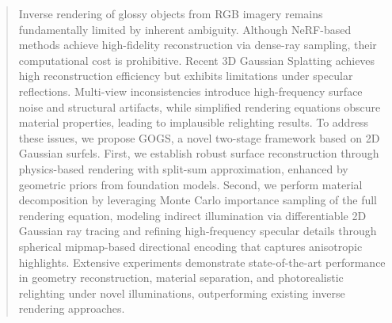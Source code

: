 \begin{abstract}
\vspace{-1em}
Inverse rendering of glossy objects from RGB imagery remains fundamentally limited by inherent ambiguity. Although NeRF-based methods achieve high-fidelity reconstruction via dense-ray sampling, their computational cost is prohibitive. Recent 3D Gaussian Splatting achieves high reconstruction efficiency but exhibits limitations under specular reflections. Multi-view inconsistencies introduce high-frequency surface noise and structural artifacts, while simplified rendering equations obscure material properties, leading to implausible relighting results. To address these issues, we propose GOGS, a novel two-stage framework based on 2D Gaussian surfels. First, we establish robust surface reconstruction through physics-based rendering with split-sum approximation, enhanced by geometric priors from foundation models. Second, we perform material decomposition by leveraging Monte Carlo importance sampling of the full rendering equation, modeling indirect illumination via differentiable 2D Gaussian ray tracing and refining high-frequency specular details through spherical mipmap-based directional encoding that captures anisotropic highlights. Extensive experiments demonstrate state-of-the-art performance in geometry reconstruction, material separation, and photorealistic relighting under novel illuminations, outperforming existing inverse rendering approaches.
\end{abstract}